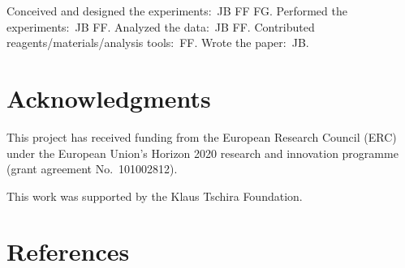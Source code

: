 \documentclass[
  twocolumn]{biophys-new-mod}
\begin{document}
Conceived and designed the experiments:~JB FF FG. Performed the
experiments:~JB FF. Analyzed the data:~JB FF. Contributed
reagents/materials/analysis tools:~FF. Wrote the paper:~JB.

\hypertarget{acknowledgments}{%
\section{Acknowledgments}\label{acknowledgments}}

This project has received funding from the European Research Council
(ERC) under the European Union's Horizon 2020 research and innovation
programme (grant agreement No.~101002812).

This work was supported by the Klaus Tschira Foundation.

\hypertarget{references}{%
\section{References}\label{references}}
\end{document}
